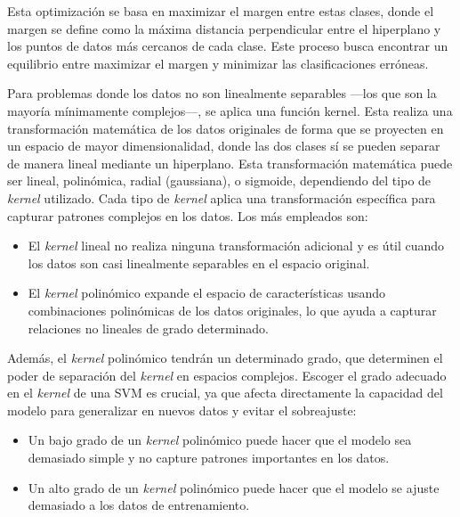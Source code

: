 \begin{enumerate}
    Esta optimización se basa en maximizar el margen entre estas clases, donde el margen se define como la máxima distancia perpendicular entre el hiperplano y los puntos de datos más cercanos de cada clase. Este proceso busca encontrar un equilibrio entre maximizar el margen y minimizar las clasificaciones erróneas.

    Para problemas donde los datos no son linealmente separables ---los que son la mayoría mínimamente complejos---,  se aplica una función kernel. Esta realiza una transformación matemática de los datos originales de forma que se proyecten en un espacio de mayor dimensionalidad, donde las dos clases sí se pueden separar de manera lineal mediante un hiperplano. Esta transformación matemática puede ser lineal, polinómica, radial (gaussiana), o sigmoide, dependiendo del tipo de \textit{kernel} utilizado. Cada tipo de \textit{kernel} aplica una transformación específica para capturar patrones complejos en los datos. Los más empleados son:

    \begin{itemize}

        \item El \textit{kernel} lineal no realiza ninguna transformación adicional y es útil cuando los 
        datos son casi linealmente separables en el espacio original.

        \item El \textit{kernel} polinómico expande el espacio de características usando combinaciones 
        polinómicas de los datos originales, lo que ayuda a capturar relaciones no lineales de 
        grado determinado.
        
    \end{itemize}

    Además, el \textit{kernel} polinómico tendrán un determinado grado, que determinen el poder de separación del \textit{kernel} en espacios complejos. Escoger el grado adecuado en el \textit{kernel} de una SVM es crucial, ya que afecta directamente la capacidad del modelo para generalizar en nuevos datos y evitar el sobreajuste:

    \begin{itemize}

        \item Un bajo grado de un \textit{kernel} polinómico puede hacer que el modelo sea demasiado simple y no capture patrones importantes en los datos.

        \item Un alto grado de un \textit{kernel} polinómico puede hacer que el modelo se ajuste demasiado a los datos de entrenamiento.


\end{itemize}
\end{enumerate}
